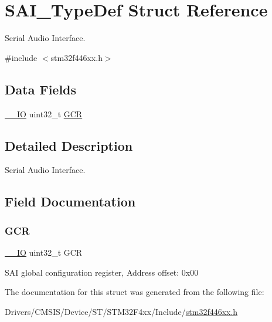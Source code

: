 \hypertarget{struct_s_a_i___type_def}{}\section{S\+A\+I\+\_\+\+Type\+Def Struct Reference}
\label{struct_s_a_i___type_def}


Serial Audio Interface.  




{\ttfamily \#include $<$stm32f446xx.\+h$>$}

\subsection*{Data Fields}
\begin{DoxyCompactItemize}
\item 
\mbox{\hyperlink{core__sc300_8h_aec43007d9998a0a0e01faede4133d6be}{\+\_\+\+\_\+\+IO}} uint32\+\_\+t \mbox{\hyperlink{struct_s_a_i___type_def_aae092d9d07574afe1fbc79c8bf7f7c19}{G\+CR}}
\end{DoxyCompactItemize}


\subsection{Detailed Description}
Serial Audio Interface. 

\subsection{Field Documentation}
\mbox{\label{struct_s_a_i___type_def_aae092d9d07574afe1fbc79c8bf7f7c19}} 
\subsubsection{\texorpdfstring{G\+CR}{GCR}}
{\footnotesize\ttfamily \mbox{\hyperlink{core__sc300_8h_aec43007d9998a0a0e01faede4133d6be}{\+\_\+\+\_\+\+IO}} uint32\+\_\+t G\+CR}

S\+AI global configuration register, Address offset\+: 0x00 

The documentation for this struct was generated from the following file\+:\begin{DoxyCompactItemize}
\item 
Drivers/\+C\+M\+S\+I\+S/\+Device/\+S\+T/\+S\+T\+M32\+F4xx/\+Include/\mbox{\hyperlink{stm32f446xx_8h}{stm32f446xx.\+h}}\end{DoxyCompactItemize}
